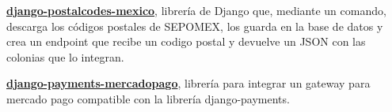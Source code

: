\begin{cvpubs}
  \cvpub
    {
      \begin{cvlist}
        \item {\textbf{\href{https://pypi.org/project/django-postalcodes-mexico/}{django-postalcodes-mexico}}, librería de Django que, mediante un comando, descarga los códigos postales de SEPOMEX, los guarda en la base de datos y crea un endpoint que recibe un codigo postal y devuelve un JSON con las colonias que lo integran.}
  \item {\textbf{\href{https://pypi.org/project/django-payments-mercadopago/}{django-payments-mercadopago}}, librería para integrar un gateway para mercado pago compatible con la librería django-payments. }
      \end{cvlist}
    }
\vspace{-15pt}
\end{cvpubs}
